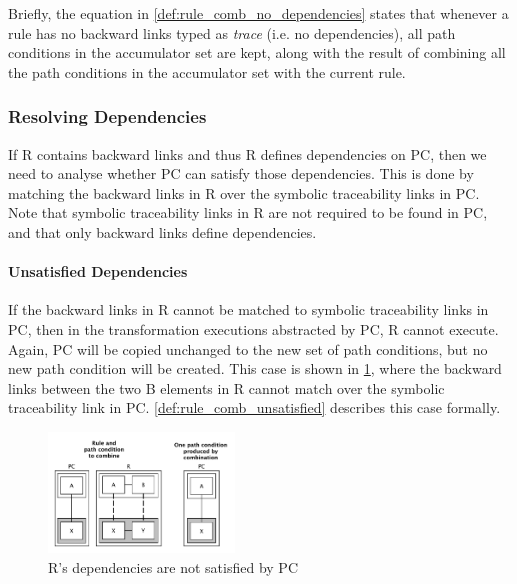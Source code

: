 Briefly, the equation in \cref{def:rule_comb_no_dependencies} states that whenever a rule has no backward links typed as \emph{trace} (i.e. no dependencies), all path conditions in the accumulator set are kept, along with the result of combining all the path conditions in the accumulator set with the current rule. 

\subsubsection{Resolving Dependencies}
\label{subsubsec:resolve_dependencies}
If R contains backward links and thus R defines dependencies on PC, then we need to analyse whether PC can satisfy those dependencies. This is done by matching the backward links in R over the symbolic traceability links in PC. Note that symbolic traceability links in R are not required to be found in PC, and that only backward links define dependencies.

\paragraph{Unsatisfied Dependencies}


If the backward links in R cannot be matched to symbolic traceability links in PC, then in the transformation executions abstracted by PC, R cannot execute. Again, PC will be copied unchanged to the new set of path conditions, but no new path condition will be created. This case is shown in \cref{fig:non_satisfied_dependencies}, where the backward links between the two B elements in R cannot match over the symbolic traceability link in PC. \cref{def:rule_comb_unsatisfied} describes this case formally.

\begin{figure}[h!] \centering \includegraphics[width=0.44\textwidth]{./figures/building_path_conditions/non_satisfied_dependencies.pdf}
	\caption{R's dependencies are not satisfied by PC}
	\label{fig:non_satisfied_dependencies}
\end{figure}

